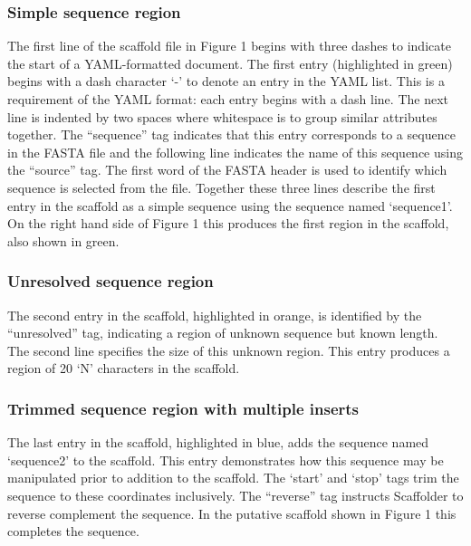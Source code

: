 \documentclass[10pt]{bmc_article}
\newenvironment{bmcformat}{\begin{raggedright}\baselineskip20pt\sloppy\setboolean{publ}{false}}{\end{raggedright}\baselineskip20pt\sloppy}
\begin{document}
\begin{bmcformat}
\subsubsection*{Simple sequence region} %

The first line of the scaffold file in Figure 1 begins with three dashes to
indicate the start of a YAML-formatted document. The first entry (highlighted
in green) begins with a dash character `-' to denote an entry in the YAML
list. This is a requirement of the YAML format:  each entry
begins with a dash line. The next line is indented by two spaces where
whitespace is  to group similar attributes together.
The ``sequence'' tag indicates that this entry corresponds to a sequence in
the FASTA file and the following line indicates the name of this sequence
using the ``source'' tag. The first word of the FASTA header is used to
identify which sequence is selected from the file. Together these three lines
describe the first entry in the scaffold as a simple sequence using the
sequence named `sequence1'. On the right hand side of Figure 1 this produces
the first region in the scaffold, also shown in green. \pb

\subsubsection*{Unresolved sequence region} %

The second entry in the scaffold, highlighted in orange, is identified by the
``unresolved'' tag, indicating a region of unknown sequence but known length.
The second line specifies the size of this unknown region. This entry produces
a region of 20 `N' characters in the scaffold. \pb

\subsubsection*{Trimmed sequence region with multiple inserts} %

The last entry in the scaffold, highlighted in blue, adds the sequence named
`sequence2' to the scaffold. This entry demonstrates how this sequence may be
manipulated prior to addition to the scaffold. The `start' and `stop' tags
trim the sequence to these coordinates inclusively. The
``reverse'' tag  instructs Scaffolder to  reverse
complement the sequence. In the putative scaffold shown in Figure 1 this
completes the  sequence. \pb


\end{bmcformat}
\end{document}
